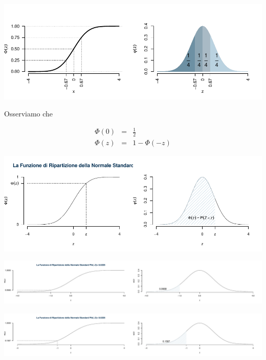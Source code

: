 \documentclass[
  11pt,
]{book}
\theoremstyle{mytheoremstyle}
\theoremstyle{mydefstyle}
\begin{document}
\begin{center}\includegraphics{Appunti_di_Statistica_2025_files/figure-latex/07c-Normale-7,-1} \end{center}

Osserviamo che

\begin{eqnarray*}
  \Phi(0) &=&  \frac 1 2 \\
  \Phi(z) &=& 1- \Phi(-z)
\end{eqnarray*}

\begin{center}\includegraphics{Appunti_di_Statistica_2025_files/figure-latex/07c-Normale-8,-1} \end{center}

\begin{center}\includegraphics{Appunti_di_Statistica_2025_files/figure-latex/07c-Normale-33-1} \end{center}

\begin{center}\includegraphics{Appunti_di_Statistica_2025_files/figure-latex/07c-Normale-33-2} \end{center}
\end{document}
